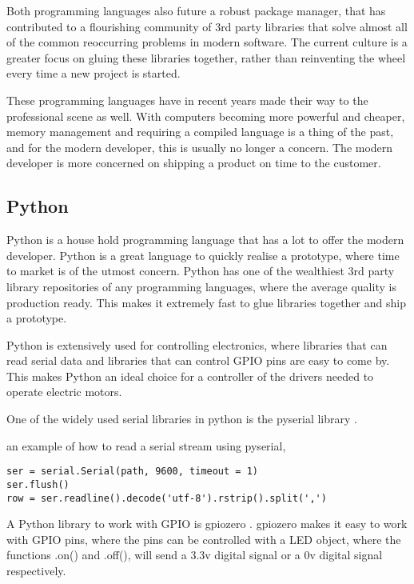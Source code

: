 \documentclass[a4paper,12pt,twoside,openright,titlepage]{book}
\begin{document}
Both programming languages also future a robust package manager, that has contributed to a flourishing community of 3rd party libraries that solve almost all of the common reoccurring problems in modern software. The current culture is a greater focus on gluing these libraries together, rather than reinventing the wheel every time a new project is started.

These programming languages have in recent years made their way to the professional scene as well. With computers becoming more powerful and cheaper, memory management and requiring a compiled language is a thing of the past, and for the modern developer, this is usually no longer a concern.
The modern developer is more concerned on shipping a product on time to the customer.

\subsection{Python}
Python is a house hold programming language that has a lot to offer the modern developer. Python is a great language to quickly realise a prototype, where time to market is of the utmost concern.
Python has one of the wealthiest 3rd party library repositories of any programming languages, where the average quality is production ready. This makes it extremely fast to glue libraries together and ship a prototype.

Python is extensively used for controlling electronics, where libraries that can read serial data and libraries that can control GPIO pins are easy to come by. This makes Python an ideal choice for a controller of the drivers needed to operate electric motors.

\bigskip

One of the widely used serial libraries in python is the pyserial library \cite{pyserial}.

an example of how to read a serial stream using pyserial,

\begin{verbatim}
ser = serial.Serial(path, 9600, timeout = 1)
ser.flush()
row = ser.readline().decode('utf-8').rstrip().split(',')
\end{verbatim}

\bigskip

A Python library to work with GPIO is gpiozero \cite{gpiozero}.
gpiozero makes it easy to work with GPIO pins, where the pins can be controlled with a LED object, where the functions .on() and .off(), will send a 3.3v digital signal or a 0v digital signal respectively.
\end{document}
